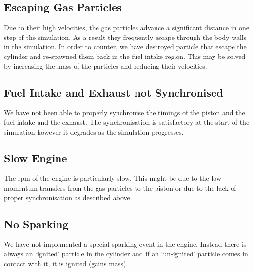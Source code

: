 \documentclass[11pt]{article}
\begin{document}
\subsection{Escaping Gas Particles}
Due to their high velocities, the gas particles advance a significant distance in one step of the simulation. As a result they frequently escape through the body walls in the simulation. In order to counter, we have destroyed particle that escape the cylinder and re-spawned them back in the fuel intake region. This may be solved by increasing the mass of the particles and reducing their velocities.
\subsection{Fuel Intake and Exhaust not Synchronised}
We have not been able to properly synchronise the timings of the piston and the fuel intake and the exhaust. The synchronisation is satisfactory at the start of the simulation however it degrades as the simulation progresses.
\subsection{Slow Engine}
The rpm of the engine is particularly slow. This might be due to the low momentum transfers from the gas particles to the piston or due to the lack of proper synchronisation as described above.
\subsection{No Sparking}
We have not implemented a special sparking event in the engine. Instead there is always an `ignited'  particle in the cylinder and if an `un-ignited' particle comes in contact with it, it is ignited (gains mass).
\end{document}
